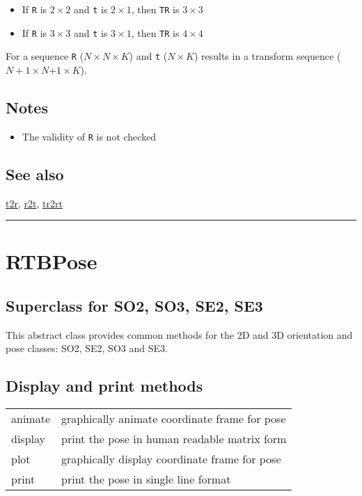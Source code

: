 \begin{itemize}
  \item If \texttt{R} is $2 \times 2$ and \texttt{t} is $2 \times 1$, then \texttt{TR} is $3 \times 3$
  \item If \texttt{R} is $3 \times 3$ and \texttt{t} is $3 \times 1$, then \texttt{TR} is $4 \times 4$
\end{itemize}


For a sequence \texttt{R} ($N \times N \times K$) and \texttt{t} ($N \times K$) results in a transform sequence ($N+1 \times N$+$1 \times K$).


\subsection*{Notes}
\begin{itemize}
  \item The validity of \texttt{R} is not checked
\end{itemize}

\subsection*{See also}


\hyperlink{t2r}{\color{blue} t2r}, \hyperlink{r2t}{\color{blue} r2t}, \hyperlink{tr2rt}{\color{blue} tr2rt}

\vspace{1.5ex}\rule{\textwidth}{1mm}

\hypertarget{RTBPose}{\section*{RTBPose}}
\subsection*{Superclass for SO2, SO3, SE2, SE3}


This abstract class provides common methods for the 2D and 3D orientation and pose
classes: SO2, SE2, SO3 and SE3.


\subsection*{Display and print methods}
\begin{longtable}{lp{120mm}}
animate & graphically animate coordinate frame for pose\\ 
display & print the pose in human readable matrix form\\ 
plot & graphically display coordinate frame for pose\\ 
print & print the pose in single line format\\ 
\end{longtable}\vspace{1ex}

